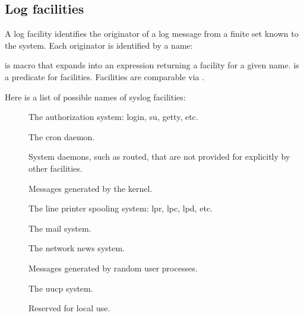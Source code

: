 \subsection*{Log facilities}

A log facility identifies the originator of a log message from a
finite set known to the system.  Each originator is identified by a
name:

\begin{protos}
\end{protos}
\noindent
{} is macro that expands into an expression
returning a facility for a given name.   is a
predicate for facilities.  Facilities are comparable via .

Here is a list of possible names of syslog facilities:

\begin{description}
\item[]
  The authorization system: login, su, getty, etc.

\item[]
  The cron daemon.

\item[]
  System daemons, such as routed, that are not provided for explicitly
  by other facilities.

\item[]
  Messages generated by the kernel.

\item[]
  The line printer spooling system: lpr, lpc, lpd, etc.

\item[]
  The mail system.

\item[]
  The network news system.

\item[]
  Messages generated by random user processes.

\item[]
  The uucp system.

\item[       ]
  Reserved for local use.
\end{description}
                                
